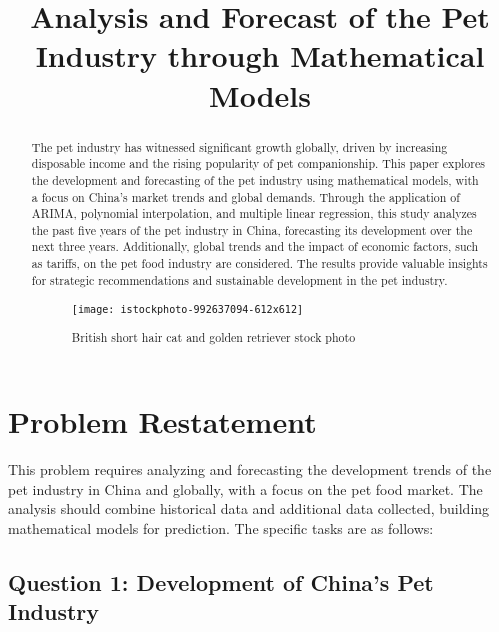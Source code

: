 \documentclass[withoutpreface,bwprint]{cumcmthesis} %
\title{Analysis and Forecast of the Pet Industry through Mathematical Models}
\begin{document}
 \maketitle
 \begin{abstract}
    The pet industry has witnessed significant growth globally, driven by increasing disposable income and the rising popularity of pet companionship. This paper explores the development and forecasting of the pet industry using mathematical models, with a focus on China's market trends and global demands. Through the application of ARIMA, polynomial interpolation, and multiple linear regression, this study analyzes the past five years of the pet industry in China, forecasting its development over the next three years. Additionally, global trends and the impact of economic factors, such as tariffs, on the pet food industry are considered. The results provide valuable insights for strategic recommendations and sustainable development in the pet industry.
    
\begin{figure}[htbp]
	\centering
	\texttt{[image: istockphoto-992637094-612x612]}
	\caption{British short hair cat and golden retriever stock photo\cite{1}}
\end{figure}

\end{abstract}

\tableofcontents

\section{Problem Restatement}

This problem requires analyzing and forecasting the development trends of the pet industry in China and globally, with a focus on the pet food market. The analysis should combine historical data and additional data collected, building mathematical models for prediction. The specific tasks are as follows:
\subsection{Question 1: Development of China's Pet Industry}
\end{document}
